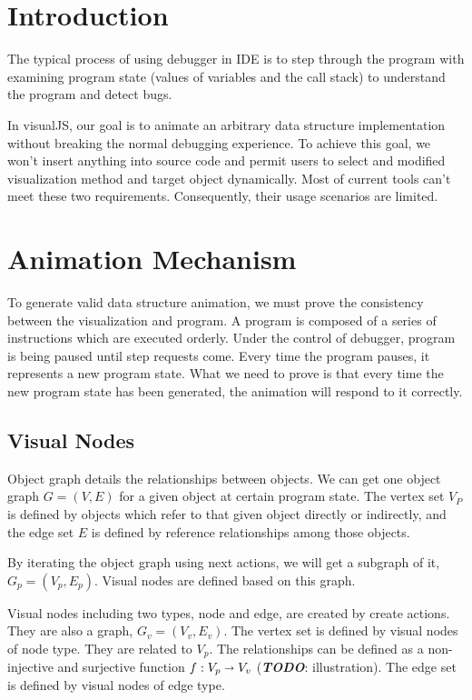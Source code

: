 \documentclass[11pt]{article}
\begin{document}
\section{Introduction}
The typical process of using debugger in IDE is to step through the program with examining program state (values of variables and the call stack) to understand the program and detect bugs.

\noindent In visualJS, our goal is to animate an arbitrary data structure implementation without breaking the normal debugging experience. To achieve this goal, we won't insert anything into source code and permit users to select and modified visualization method and target object dynamically. Most of current tools can't meet these two requirements. Consequently, their  usage scenarios are limited. 

\section{Animation Mechanism}
To generate valid data structure animation, we must prove the consistency between the visualization and program. A program is composed of a series of instructions which are executed orderly. Under the control of debugger, program is being paused until step requests come. Every time the program pauses, it represents a new program state. What we need to prove is that every time the new program state has been generated, the animation will respond to it correctly.

\subsection{Visual Nodes}
Object graph details the relationships between objects. We can get one object graph \(G = (V, E)\) for a given object at certain program state. The vertex set $V_P$ is defined by objects which refer to that given object directly or indirectly, and the edge set $E$ is defined by reference relationships among those objects.

\noindent By iterating the object graph using next actions, we will get a subgraph of it, \(G_p = (V_p, E_p)\). Visual nodes are defined based on this graph. 

\noindent Visual nodes including two types, node and edge, are created by create actions. They are also a graph, \(G_v = (V_v, E_v)\). The vertex set is defined by visual nodes of node type. They are related to $V_p$. The relationships can be defined as a non-injective and surjective function \(f:V_p\shortrightarrow V_v\) (\textbf{\textit{TODO}}: illustration). The edge set is defined by visual nodes of edge type.
\end{document}
